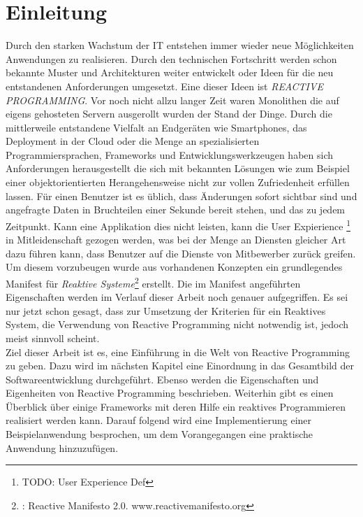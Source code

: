 \chapter{Einleitung}
\label{cha:einleitung}

Durch den starken Wachstum der IT entstehen immer wieder neue Möglichkeiten Anwendungen zu realisieren. Durch den technischen Fortschritt werden schon bekannte Muster und Architekturen weiter entwickelt oder Ideen für die neu entstandenen Anforderungen umgesetzt. Eine dieser Ideen ist \textit{REACTIVE PROGRAMMING}. Vor noch nicht allzu langer Zeit waren Monolithen die auf eigens gehosteten Servern ausgerollt wurden der Stand der Dinge. Durch die mittlerweile entstandene Vielfalt an Endgeräten wie Smartphones, das Deployment in der Cloud oder die Menge an spezialisierten Programmiersprachen, Frameworks und Entwicklungswerkzeugen haben sich Anforderungen herausgestellt die sich mit bekannten Lösungen wie zum Beispiel einer objektorientierten Herangehensweise nicht zur vollen Zufriedenheit erfüllen lassen. Für einen Benutzer ist es üblich, dass Änderungen sofort sichtbar sind und angefragte Daten in Bruchteilen einer Sekunde bereit stehen, und das zu jedem Zeitpunkt. Kann eine Applikation dies nicht leisten, kann die User Expierience \footnote{TODO: User Experience Def} in Mitleidenschaft gezogen werden, was bei der Menge an Diensten gleicher Art dazu führen kann, dass Benutzer auf die Dienste von Mitbewerber zurück greifen. Um diesem vorzubeugen wurde aus vorhandenen Konzepten ein grundlegendes Manifest für \textit{Reaktive Systeme}\footnote{\cite{Boner.2014}: Reactive Manifesto 2.0. www.reactivemanifesto.org} erstellt. Die im Manifest angeführten Eigenschaften werden im Verlauf dieser Arbeit noch genauer aufgegriffen. Es sei nur jetzt schon gesagt, dass zur Umsetzung der Kriterien für ein Reaktives System, die Verwendung von Reactive Programming nicht notwendig ist, jedoch meist sinnvoll scheint. \\
Ziel dieser Arbeit ist es, eine Einführung in die Welt von Reactive Programming zu geben. Dazu wird im nächsten Kapitel eine Einordnung in das Gesamtbild der Softwareentwicklung durchgeführt. Ebenso werden die Eigenschaften und Eigenheiten von Reactive Programming beschrieben. Weiterhin gibt es einen Überblick über einige Frameworks mit deren Hilfe ein reaktives Programmieren realisiert werden kann. Darauf folgend wird eine Implementierung einer Beispielanwendung besprochen, um dem Vorangegangen eine praktische Anwendung hinzuzufügen.

